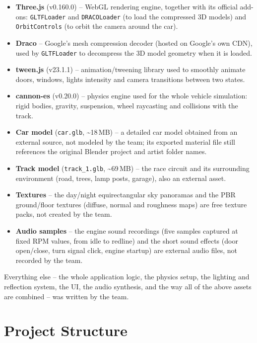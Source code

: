 \documentclass[11pt]{article}
\begin{document}
\begin{itemize}
    \item \textbf{Three.js} (v0.160.0) -- WebGL rendering engine, together
    with its official add-ons: \texttt{GLTFLoader} and \texttt{DRACOLoader}
    (to load the compressed 3D models) and \texttt{OrbitControls} (to orbit
    the camera around the car).
    \item \textbf{Draco} -- Google's mesh compression decoder (hosted on
    Google's own CDN), used by \texttt{GLTFLoader} to decompress the 3D
    model geometry when it is loaded.
    \item \textbf{tween.js} (v23.1.1) -- animation/tweening library used to
    smoothly animate doors, windows, lights intensity and camera
    transitions between two states.
    \item \textbf{cannon-es} (v0.20.0) -- physics engine used for the whole
    vehicle simulation: rigid bodies, gravity, suspension, wheel raycasting
    and collisions with the track.
    \item \textbf{Car model} (\texttt{car.glb}, \textasciitilde18\,MB) -- a
    detailed car model obtained from an external source, not modeled by the
    team; its exported material file still references the original
    Blender project and artist folder names.
    \item \textbf{Track model} (\texttt{track\_1.glb}, \textasciitilde69\,MB)
    -- the race circuit and its surrounding environment (road, trees, lamp
    posts, garage), also an external asset.
    \item \textbf{Textures} -- the day/night equirectangular sky panoramas
    and the PBR ground/floor textures (diffuse, normal and roughness maps)
    are free texture packs, not created by the team.
    \item \textbf{Audio samples} -- the engine sound recordings (five
    samples captured at fixed RPM values, from idle to redline) and the
    short sound effects (door open/close, turn signal click, engine
    startup) are external audio files, not recorded by the team.
\end{itemize}

Everything else -- the whole application logic, the physics setup, the
lighting and reflection system, the UI, the audio synthesis, and the way
all of the above assets are combined -- was written by the team.

\section{Project Structure}
\end{document}
